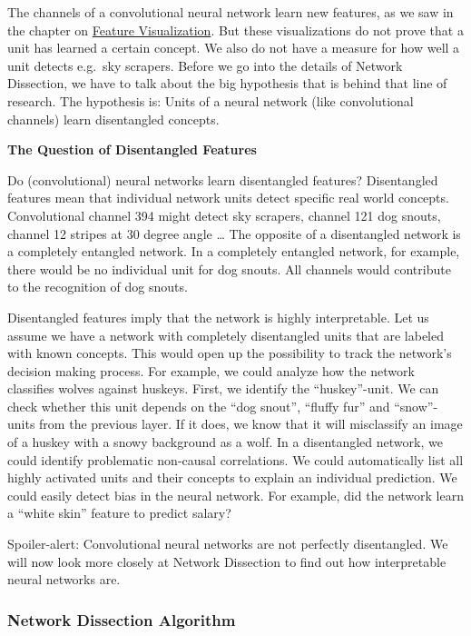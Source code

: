 \documentclass[
  12pt,
]{krantz}
\begin{document}
The channels of a convolutional neural network learn new features, as we saw in the chapter on \protect\hyperlink{feature-visualization}{Feature Visualization}.
But these visualizations do not prove that a unit has learned a certain concept.
We also do not have a measure for how well a unit detects e.g.~sky scrapers.
Before we go into the details of Network Dissection, we have to talk about the big hypothesis that is behind that line of research.
The hypothesis is:
Units of a neural network (like convolutional channels) learn disentangled concepts.

\textbf{The Question of Disentangled Features}

Do (convolutional) neural networks learn disentangled features?
Disentangled features mean that individual network units detect specific real world concepts.
Convolutional channel 394 might detect sky scrapers, channel 121 dog snouts, channel 12 stripes at 30 degree angle \ldots{}
The opposite of a disentangled network is a completely entangled network.
In a completely entangled network, for example, there would be no individual unit for dog snouts.
All channels would contribute to the recognition of dog snouts.

Disentangled features imply that the network is highly interpretable.
Let us assume we have a network with completely disentangled units that are labeled with known concepts.
This would open up the possibility to track the network's decision making process.
For example, we could analyze how the network classifies wolves against huskeys.
First, we identify the ``huskey''-unit.
We can check whether this unit depends on the ``dog snout'', ``fluffy fur'' and ``snow''-units from the previous layer.
If it does, we know that it will misclassify an image of a huskey with a snowy background as a wolf.
In a disentangled network, we could identify problematic non-causal correlations.
We could automatically list all highly activated units and their concepts to explain an individual prediction.
We could easily detect bias in the neural network.
For example, did the network learn a ``white skin'' feature to predict salary?

Spoiler-alert: Convolutional neural networks are not perfectly disentangled.
We will now look more closely at Network Dissection to find out how interpretable neural networks are.

\hypertarget{network-dissection-algorithm}{%
\subsubsection{Network Dissection Algorithm}\label{network-dissection-algorithm}}
\end{document}
